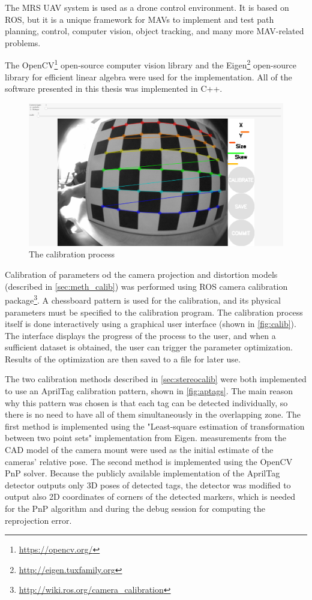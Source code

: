 The MRS UAV system \cite{Baca2021} is used as a drone control environment. It is based on ROS, but it is a unique framework for MAVs to implement and test path planning, control, computer vision, object tracking, and many more MAV-related problems.

The OpenCV\footnote{\url{https://opencv.org/}} open-source computer vision library and the Eigen\footnote{\url{http://eigen.tuxfamily.org}} open-source library for efficient linear algebra were used for the implementation.
All of the software presented in this thesis was implemented in C++.

\begin{figure}[h]
    \centering
    \includegraphics[width=.6\textwidth]{graphics/calibration.png}
    \caption{The calibration process}
    \label{fig:calib}
\end{figure}

Calibration of parameters od the camera projection and distortion models (described in \autoref{sec:meth_calib}) was performed using ROS camera calibration package\footnote{\url{http://wiki.ros.org/camera_calibration}}.
A chessboard pattern is used for the calibration, and its physical parameters must be specified to the calibration program.
The calibration process itself is done interactively using a graphical user interface (shown in \autoref{fig:calib}).
The interface displays the progress of the process to the user, and when a sufficient dataset is obtained, the user can trigger the parameter optimization. 
Results of the optimization are then saved to a file for later use.

The two calibration methods described in \autoref{sec:stereocalib} were both implemented to use an AprilTag calibration pattern, shown in \autoref{fig:aptags}.
The main reason why this pattern was chosen is that each tag can be detected individually, so there is no need to have all of them simultaneously in the overlapping zone.
The first method is implemented using the "Least-square estimation of transformation between two point sets" \cite{Umeyama1991} implementation from Eigen.
measurements from the CAD model of the camera mount were used as the initial estimate of the cameras' relative pose.
The second method is implemented using the OpenCV PnP solver.
Because the publicly available implementation of the AprilTag detector outputs only 3D poses of detected tags, the detector was modified to output also 2D coordinates of corners of the detected markers, which is needed for the PnP algorithm and during the debug session for computing the reprojection error.

